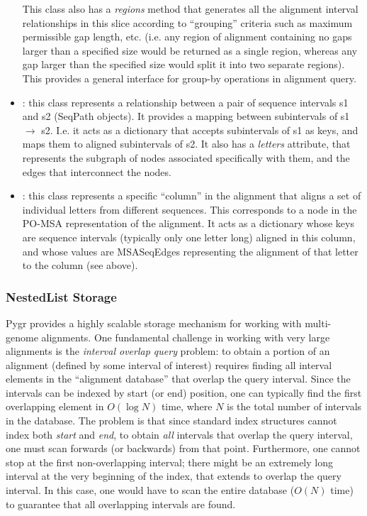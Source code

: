 \documentclass{howto}
\begin{document}
\begin{itemize}
This class also has a {\em regions} method that generates all the alignment
interval relationships in this slice according to ``grouping'' criteria such
as maximum permissible gap length, etc.  (i.e. any region of alignment containing
no gaps larger than a specified size would be returned as a single region, 
whereas any gap larger than the specified size would split it into two separate
regions).  This provides a general interface for group-by operations in alignment
query.

\item    
{}: this class represents a relationship between a pair of 
sequence intervals s1 and s2 (SeqPath objects).  It provides a mapping between
subintervals of s1 $\rightarrow$ s2.  I.e. it acts as a dictionary 
that accepts subintervals of s1 as keys, and maps them to aligned
subintervals of s2.  It also 
has a {\em letters} attribute, that represents the subgraph of nodes
associated specifically with them, and the edges that interconnect the nodes.

\item    
{}: this class represents a specific ``column'' in the alignment
that aligns a set of individual letters from different sequences.  This
corresponds to a node in the PO-MSA representation of the alignment.
It acts as a dictionary whose keys are sequence intervals (typically only
one letter long) aligned in this column, and whose values are MSASeqEdges
representing the alignment of that letter to the column (see above).

\end{itemize}

\subsubsection{NestedList Storage}
Pygr provides a highly scalable storage mechanism for working with
multi-genome alignments.  One fundamental challenge in working with
very large alignments is the {\em interval overlap query} problem: 
to obtain a portion of an alignment (defined by some interval of
interest) requires finding all interval elements in the ``alignment
database'' that overlap the query interval.  Since the intervals
can be indexed by start (or end) position, one can typically find the
first overlapping element in $O(\log N)$ time, where $N$ is the total
number of intervals in the database.  The problem is that since
standard index structures cannot index both {\em start} and {\em end}, 
to obtain {\em all} intervals that overlap the query interval, one must scan
forwards (or backwards) from that point.  Furthermore, one cannot stop
at the first non-overlapping interval; there might be an extremely long 
interval at the very beginning of the index, that extends to overlap 
the query interval.  In this case, one would have to scan the entire
database ($O(N)$ time) to guarantee that all overlapping intervals are
found.
\end{document}
